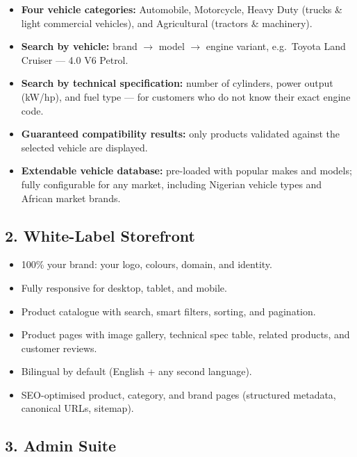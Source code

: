 \documentclass[11pt,a4paper]{article}
\begin{document}
\begin{itemize}[leftmargin=1.4em,itemsep=3pt]
  \item \textbf{Four vehicle categories:} Automobile, Motorcycle,
        Heavy Duty (trucks \& light commercial vehicles), and
        Agricultural (tractors \& machinery).
  \item \textbf{Search by vehicle:} brand $\rightarrow$ model
        $\rightarrow$ engine variant, e.g.\ Toyota Land Cruiser ---
        4.0 V6 Petrol.
  \item \textbf{Search by technical specification:} number of
        cylinders, power output (kW/hp), and fuel type --- for
        customers who do not know their exact engine code.
  \item \textbf{Guaranteed compatibility results:} only products
        validated against the selected vehicle are displayed.
  \item \textbf{Extendable vehicle database:} pre-loaded with
        popular makes and models; fully configurable for any
        market, including Nigerian vehicle types and African
        market brands.
\end{itemize}

\subsection{2. White-Label Storefront}

\begin{itemize}[leftmargin=1.4em,itemsep=3pt]
  \item 100\% your brand: your logo, colours, domain, and identity.
  \item Fully responsive for desktop, tablet, and mobile.
  \item Product catalogue with search, smart filters, sorting, and
        pagination.
  \item Product pages with image gallery, technical spec table,
        related products, and customer reviews.
  \item Bilingual by default (English + any second language).
  \item SEO-optimised product, category, and brand pages
        (structured metadata, canonical URLs, sitemap).
\end{itemize}

\subsection{3. Admin Suite}
\end{document}

